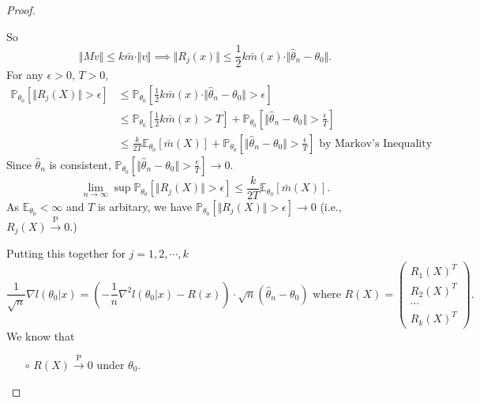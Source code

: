 \documentclass[a4paper]{article}
\begin{document}
\begin{proof}
\begin{itemize}
		So
		\begin{equation}
			\Vert Mv \Vert \leq k \bar{m} \cdot \Vert v \Vert \implies \Vert R_j(x) \Vert \leq \frac{1}{2} k \bar{m}(x) \cdot \Vert \hat{\theta}_n - \theta_0 \Vert.
		\end{equation}
		For any $\epsilon > 0$, $T > 0$,
		\begin{equation*}
			\begin{aligned}
				\mathbb{P}_{\theta_0}\left[\Vert R_j(X) \Vert > \epsilon\right] & \leq \mathbb{P}_{\theta_0}\left[\frac{1}{2} k \bar{m}(x) \cdot \Vert \hat{\theta}_n - \theta_0 \Vert > \epsilon\right] \\
				& \leq \mathbb{P}_{\theta_0}\left[\frac{1}{2} k \bar{m}(x) > T\right] + \mathbb{P}_{\theta_0}\left[\Vert \hat{\theta}_n - \theta_0 \Vert > \frac{\epsilon}{T}\right] \\
				&\leq \frac{k}{2T} \mathbb{E}_{\theta_0}\left[\bar{m}(X)\right] + \mathbb{P}_{\theta_0}\left[\Vert \hat{\theta}_n - \theta_0 \Vert > \frac{\epsilon}{T}\right] \text{ by Markov's Inequality} 
			\end{aligned}
		\end{equation*}
		Since $\hat{\theta}_n$ is consistent, $\mathbb{P}_{\theta_0}\left[\Vert \hat{\theta}_n - \theta_0 \Vert > \frac{\epsilon}{T}\right] \to 0$.
		\begin{equation}
		\lim\limits_{n \to \infty} \sup \mathbb{P}_{\theta_0}\left[\Vert R_j(X) \Vert > \epsilon\right] \leq \frac{k}{2T} \mathbb{E}_{\theta_0}\left[\bar{m}(X)\right].
		\end{equation}
		As $\mathbb{E}_{\theta_0} < \infty$ and $T$ is arbitary, we have $\mathbb{P}_{\theta_0}\left[\Vert R_j(X) \Vert > \epsilon\right] \to 0$ (i.e., $R_j(X) \stackrel{\text{P}}{\longrightarrow} 0$.)
	\end{itemize}
	Putting this together for $j = 1,2,\cdots,k$
	\begin{equation*}
		\frac{1}{\sqrt{n}} \nabla l(\theta_0|x) = \left(-\frac{1}{n} \nabla^2 l(\theta_0|x) - R(x)\right) \cdot \sqrt{n} (\hat{\theta}_n - \theta_0) \text{ where } R(X) = \left(\begin{array}{c}
				R_1(X)^T \\
				R_2(X)^T \\
				\cdots \\
				R_k(X)^T
			\end{array}\right).
	\end{equation*}
	We know that
	\begin{itemize}
		\item[$\circ$] $R(X) \stackrel{\text{P}}{\longrightarrow} 0 \text{ under } \theta_0$.

\end{itemize}
\end{proof}
\end{document}
